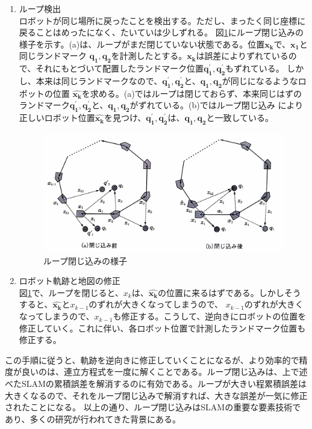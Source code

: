 \begin{enumerate}
  \item ループ検出\\
  ロボットが同じ場所に戻ったことを検出する。ただし、まったく同じ座標に戻ることはめったになく、たいていは少しずれる。
  図\ref{slam:loop_detect}にループ閉じ込みの様子を示す。(a)は、ループがまだ閉じていない状態である。位置$\bm{x_k}$で、$\bm{x_1}$と同じランドマーク
  $\bm{q_1},\bm{q_2}$を計測したとする。$\bm{x_k}$は誤差によりずれているので、それにもとづいて配置したランドマーク位置$\bm{q_1^{\prime}},\bm{q_2^{\prime}}$もずれている。
  しかし、本来は同じランドマークなので、$\bm{q_1^{\prime}},\bm{q_2^{\prime}}$と、$\bm{q_1},\bm{q_2}$が同じになるようなロボットの位置
  $\hat{\bm{x_k}}$を求める。(a)ではループは閉じておらず、本来同じはずのランドマーク$\bm{q_1^{\prime}},\bm{q_2^{\prime}}$と、$\bm{q_1},\bm{q_2}$がずれている。(b)ではループ閉じ込み
  により正しいロボット位置$\hat{\bm{x_k}}$を見つけ、$\bm{q_1^{\prime}},\bm{q_2^{\prime}}$は、$\bm{q_1},\bm{q_2}$と一致している。
  
  \begin{figure}[h]
    \begin{center}
    \includegraphics[width=.8\linewidth]{img/slam_10.pdf}
    \caption{ループ閉じ込みの様子\cite{slam:nyumon}}
    \label{slam:loop_detect}
    \end{center}
  \end{figure}
  \item ロボット軌跡と地図の修正\\
  図\ref{slam:loop_detect}で、ループを閉じると、$x_k$は、$\hat{\bm{x_k}}$の位置に来るはずである。しかしそうすると、$\hat{\bm{x_k}}$と$x_{k-1}$のずれが大きくなってしまうので、
  $x_{k-1}$のずれが大きくなってしまうので、$x_{k-1}$も修正する。こうして、逆向きにロボットの位置を修正していく。これに伴い、各ロボット位置で計測したランドマーク位置も修正する。
\end{enumerate}

この手順に従うと、軌跡を逆向きに修正していくことになるが、より効率的で精度が良いのは、連立方程式を一度に解くことである。ループ閉じ込みは、上で述べたSLAMの累積誤差を解消するのに有効である。ループが大きい程累積誤差は大きくなるので、それをループ閉じ込みで解消すれば、大きな誤差が一気に修正されたことになる。
以上の通り、ループ閉じ込みはSLAMの重要な要素技術であり、多くの研究が行われてきた背景にある。

